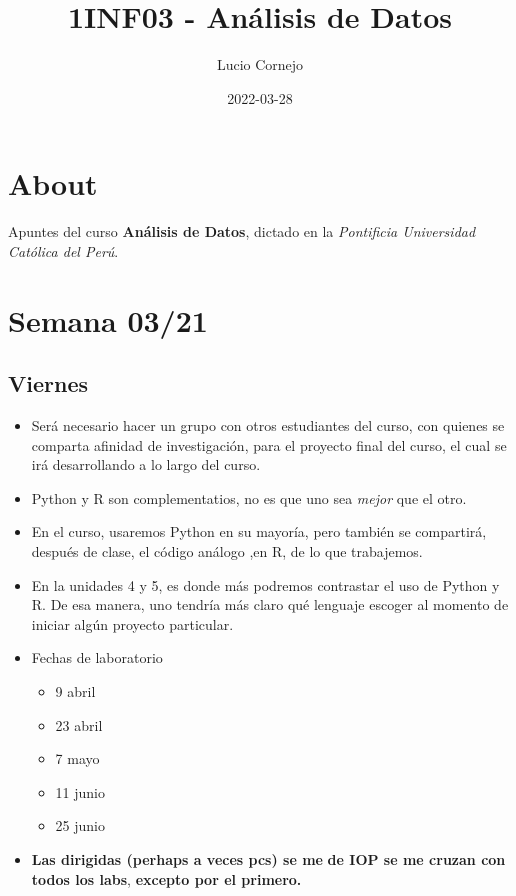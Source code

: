 \documentclass[
]{book}
\title{1INF03 - Análisis de Datos}
\author{Lucio Cornejo}
\date{2022-03-28}
\providecommand{\tightlist}{%
  \setlength{\itemsep}{0pt}\setlength{\parskip}{0pt}}
\begin{document}
\maketitle

{
\setcounter{tocdepth}{1}
\tableofcontents
}
\hypertarget{about}{%
\chapter*{About}\label{about}}

Apuntes del curso \textbf{Análisis de Datos},
dictado en la \emph{Pontificia Universidad Católica del Perú}.

\hypertarget{semana-0321}{%
\chapter{Semana 03/21}\label{semana-0321}}

\hypertarget{viernes}{%
\section{Viernes}\label{viernes}}

\begin{itemize}
\item
  Será necesario hacer un grupo con otros
  estudiantes del curso, con quienes se
  comparta afinidad de investigación, para
  el proyecto final del curso, el cual se
  irá desarrollando a lo largo del curso.
\item
  Python y R son complementatios, no
  es que uno sea \emph{mejor} que el otro.
\item
  En el curso, usaremos Python en su mayoría,
  pero también se compartirá, después de clase,
  el código análogo ,en R, de lo que trabajemos.
\item
  En la unidades 4 y 5, es donde más podremos
  contrastar el uso de Python y R. De esa manera,
  uno tendría más claro qué lenguaje escoger al
  momento de iniciar algún proyecto particular.
\item
  Fechas de laboratorio\\

  \begin{itemize}
  \tightlist
  \item
    9 abril
  \item
    23 abril
  \item
    7 mayo
  \item
    11 junio
  \item
    25 junio
  \end{itemize}
\item
  \textbf{Las dirigidas (perhaps a veces pcs) se me}
  \textbf{de IOP se me cruzan con todos los labs},
  \textbf{excepto por el primero.}
\end{itemize}
\end{document}
